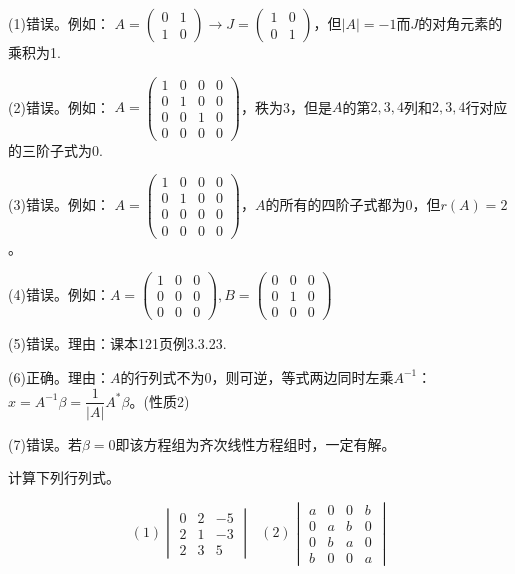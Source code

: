 \documentclass[a4paper]{report}
\begin{document}
\begin{jie}
(1)错误。例如：
$A=
\begin{pmatrix}
0&1\\
1&0
\end{pmatrix}\rightarrow J=\begin{pmatrix}
1&0\\
0&1
\end{pmatrix}
$，但$|A|=-1$而$J$的对角元素的乘积为1.

(2)错误。例如：
$A=
\begin{pmatrix}
1&0&0&0\\
0&1&0&0\\
0&0&1&0\\
0&0&0&0
\end{pmatrix}
$，秩为3，但是$A$的第$2,3,4$列和$2,3,4$行对应的三阶子式为0.

(3)错误。例如：
$A=
\begin{pmatrix}
1&0&0&0\\
0&1&0&0\\
0&0&0&0\\
0&0&0&0
\end{pmatrix}
$，$A$的所有的四阶子式都为0，但$r(A)=2$。

(4)错误。例如：$A=
\begin{pmatrix}
1&0&0\\
0&0&0\\
0&0&0
\end{pmatrix},B=\begin{pmatrix}
0&0&0\\
0&1&0\\
0&0&0
\end{pmatrix}
$

(5)错误。理由：课本121页例3.3.23.

(6)正确。理由：$A$的行列式不为0，则可逆，等式两边同时左乘$A^{-1}$：$x=A^{-1}\beta=\dfrac{1}{|A|}A^*\beta$。(性质2)

(7)错误。若$\beta=0$即该方程组为齐次线性方程组时，一定有解。
\end{jie}

\EX 计算下列行列式。

\begin{equation*}
(1)
\begin{vmatrix}
0&2&-5\\
2&1&-3\\
2&3&5
\end{vmatrix}~~~(2)
\begin{vmatrix}
a&0&0&b\\
0&a&b&0\\
0&b&a&0\\
b&0&0&a
\end{vmatrix}
\end{equation*}
\end{document}

